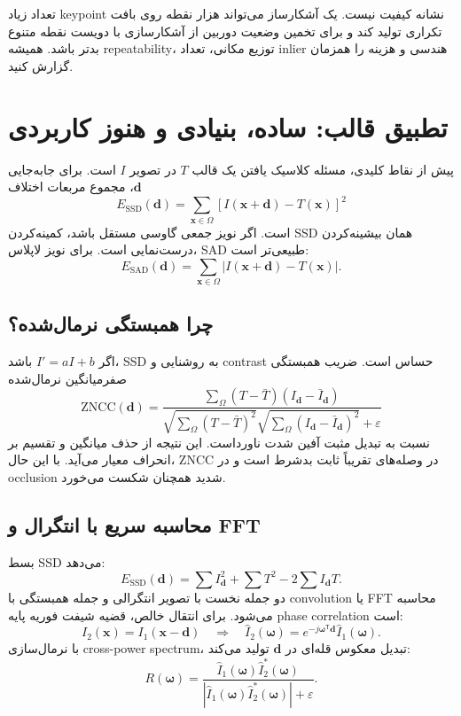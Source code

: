 \documentclass[12pt,openany,oneside]{book}
\newcommand{\abs}[1]{\left\lvert #1\right\rvert}
\newcommand{\trans}{^{\mathsf T}}
\newcommand{\vect}[1]{\bm{#1}}
\begin{document}
\begin{warningbox}
تعداد زیاد keypoint نشانه کیفیت نیست. یک آشکارساز می‌تواند هزار نقطه روی بافت تکراری تولید کند و برای تخمین وضعیت دوربین
از آشکارسازی با دویست نقطه متنوع بدتر باشد. همیشه repeatability، توزیع مکانی، تعداد inlier هندسی و هزینه را همزمان گزارش کنید.
\end{warningbox}

\section{تطبیق قالب: ساده، بنیادی و هنوز کاربردی}
پیش از نقاط کلیدی، مسئله کلاسیک یافتن یک قالب $T$ در تصویر $I$ است. برای جابه‌جایی $\vect d$، مجموع مربعات اختلاف
\begin{equation}
E_{\mathrm{SSD}}(\vect d)=\sum_{\vect x\in\Omega}
\left[I(\vect x+\vect d)-T(\vect x)\right]^2
\label{eq:ssd}
\end{equation}
است. اگر نویز جمعی گاوسی مستقل باشد، کمینه‌کردن SSD همان بیشینه‌کردن درست‌نمایی است. برای نویز لاپلاس، SAD طبیعی‌تر است:
\begin{equation}
E_{\mathrm{SAD}}(\vect d)=\sum_{\vect x\in\Omega}
\abs{I(\vect x+\vect d)-T(\vect x)}.
\end{equation}

\subsection{چرا همبستگی نرمال‌شده؟}
اگر $I'=aI+b$ باشد، SSD به روشنایی و contrast حساس است. ضریب همبستگی صفرمیانگین نرمال‌شده
\begin{equation}
\mathrm{ZNCC}(\vect d)=
\frac{\sum_{\Omega}(T-\bar T)(I_{\vect d}-\bar I_{\vect d})}
{\sqrt{\sum_{\Omega}(T-\bar T)^2}\sqrt{\sum_{\Omega}(I_{\vect d}-\bar I_{\vect d})^2}+\varepsilon}
\label{eq:zncc}
\end{equation}
نسبت به تبدیل مثبت آفین شدت ناورداست. این نتیجه از حذف میانگین و تقسیم بر انحراف معیار می‌آید. با این حال، ZNCC در
وصله‌های تقریباً ثابت بدشرط است و در occlusion شدید همچنان شکست می‌خورد.

\subsection{محاسبه سریع با انتگرال و FFT}
بسط SSD می‌دهد:
\begin{equation}
E_{\mathrm{SSD}}(\vect d)=\sum I_{\vect d}^2+\sum T^2-2\sum I_{\vect d}T.
\end{equation}
دو جمله نخست با تصویر انتگرالی و جمله همبستگی با convolution یا FFT محاسبه می‌شود. برای انتقال خالص، قضیه شیفت فوریه
پایه phase correlation است:
\begin{equation}
I_2(\vect x)=I_1(\vect x-\vect d)
\quad\Longrightarrow\quad
\widehat I_2(\vect\omega)=e^{-j\vect\omega\trans\vect d}\widehat I_1(\vect\omega).
\end{equation}
با نرمال‌سازی cross-power spectrum، تبدیل معکوس قله‌ای در $\vect d$ تولید می‌کند:
\begin{equation}
R(\vect\omega)=\frac{\widehat I_1(\vect\omega)\widehat I_2^*(\vect\omega)}
{\abs{\widehat I_1(\vect\omega)\widehat I_2^*(\vect\omega)}+\varepsilon}.
\end{equation}
\end{document}
